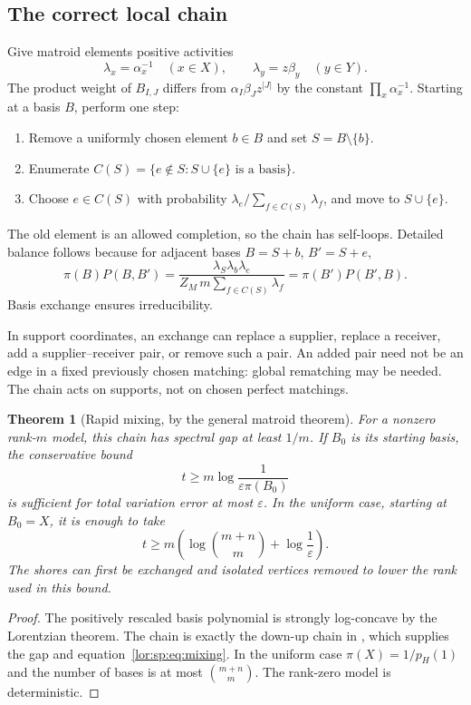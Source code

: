 \documentclass[11pt]{article}
\numberwithin{equation}{section}
\newtheorem{theorem}{Theorem}[section]
\theoremstyle{definition}
\begin{document}
\subsection{The correct local chain}
Give matroid elements positive activities
\[
 \lambda_x=\alpha_x^{-1}\quad(x\in X),\qquad
 \lambda_y=z\beta_y\quad(y\in Y).
\]
The product weight of $B_{I,J}$ differs from $\alpha_I\beta_Jz^{|J|}$ by the
constant $\prod_x\alpha_x^{-1}$. Starting at a basis $B$, perform one step:
\begin{enumerate}[leftmargin=1.8em]
\item Remove a uniformly chosen element $b\in B$ and set $S=B\setminus\{b\}$.
\item Enumerate $C(S)=\{e\notin S:S\cup\{e\}\text{ is a basis}\}$.
\item Choose $e\in C(S)$ with probability
$\lambda_e/\sum_{f\in C(S)}\lambda_f$, and move to $S\cup\{e\}$.
\end{enumerate}
The old element is an allowed completion, so the chain has self-loops.
Detailed balance follows because for adjacent bases $B=S+b$, $B'=S+e$,
\[
 \pi(B)P(B,B')=
 \frac{\lambda_S\lambda_b\lambda_e}
 {Z_M\,m\sum_{f\in C(S)}\lambda_f}
 =\pi(B')P(B',B).
\]
Basis exchange ensures irreducibility.

In support coordinates, an exchange can replace a supplier, replace a receiver,
add a supplier--receiver pair, or remove such a pair. An added pair need not be
an edge in a fixed previously chosen matching: global rematching may be needed.
The chain acts on supports, not on chosen perfect matchings.

\begin{theorem}[Rapid mixing, by the general matroid theorem]
\label{lor:sp:thm:mixing}
For a nonzero rank-$m$ model, this chain has spectral gap at least $1/m$.
If $B_0$ is its starting basis, the conservative bound
\begin{equation}
 t\ge m\log\frac1{\varepsilon\pi(B_0)}
 \label{lor:sp:eq:mixing}
\end{equation}
is sufficient for total variation error at most $\varepsilon$.
In the uniform case, starting at $B_0=X$, it is enough to take
\begin{equation}
 t\ge m\left(\log\binom{m+n}{m}+\log\frac1\varepsilon\right).
 \label{lor:sp:eq:uniformmixing}
\end{equation}
The shores can first be exchanged and isolated vertices removed to lower the
rank used in this bound.
\end{theorem}
\begin{proof}
The positively rescaled basis polynomial is strongly log-concave by the
Lorentzian theorem. The chain is exactly the down-up chain in
\cite[Theorem 1.1]{ALOV}, which supplies the gap and equation~\eqref{lor:sp:eq:mixing}.
In the uniform case $\pi(X)=1/p_H(1)$ and the number of bases is at most
$\binom{m+n}{m}$. The rank-zero model is deterministic.
\end{proof}
\end{document}
